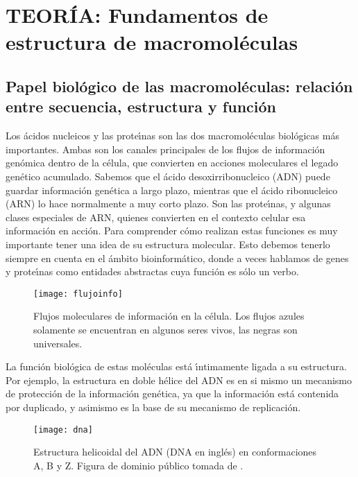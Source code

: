 \chapter{TEOR\'{I}A: Fundamentos de estructura de macromol\'{e}culas} \label{macro1}


\section{Papel biol\'{o}gico de las macromol\'{e}culas: relaci\'{o}n entre secuencia, estructura y funci\'{o}n}

Los \'{a}cidos nucleicos y las prote\'\i{}nas son las dos macromol\'{e}culas biol\'{o}gicas m\'{a}s importantes.
Ambas son los canales principales de los flujos de 
informaci\'{o}n gen\'{o}mica dentro de la c\'{e}lula, que convierten en acciones moleculares el legado gen\'{e}tico
acumulado. Sabemos que el \'{a}cido desoxirribonucleico (ADN) puede guardar informaci\'{o}n gen\'{e}tica a largo 
plazo, mientras que el \'{a}cido ribonucleico (ARN) lo hace normalmente a muy corto plazo. Son las prote\'\i{}nas,
y algunas clases especiales de ARN, quienes convierten en el contexto celular esa informaci\'{o}n en acci\'{o}n. 
Para comprender c\'{o}mo realizan estas funciones es muy importante tener una idea de su estructura molecular. 
Esto debemos tenerlo siempre en cuenta en el \'{a}mbito bioinform\'{a}tico, donde a veces hablamos de genes y 
prote\'\i{}nas como entidades abstractas cuya funci\'{o}n es s\'{o}lo un verbo.


\begin{figure}
\begin{center} 
\texttt{[image: flujoinfo]}
\caption%
{
Flujos moleculares de informaci\'{o}n en la c\'{e}lula. 
Los flujos azules solamente se encuentran en algunos seres vivos, las negras son universales.
}
\label{fig:flujosinfobio}
\end{center}
\end{figure}

La funci\'{o}n biol\'{o}gica de estas mol\'{e}culas est\'{a} \'\i{}ntimamente ligada a su estructura. Por ejemplo, la estructura en doble h\'{e}lice 
del ADN es en si mismo un mecanismo de protecci\'{o}n de la informaci\'{o}n gen\'{e}tica, ya que la informaci\'{o}n est\'{a} contenida por 
duplicado, y asimismo es la base de su mecanismo de replicaci\'{o}n.


\begin{figure}
\begin{center} 
\texttt{[image: dna]}
\caption%
{
Estructura helicoidal del ADN (DNA en ingl\'{e}s) en conformaciones A, B y Z.
Figura de dominio p\'{u}blico tomada de 
.
}
\label{fig:dna}
\end{center}
\end{figure}


